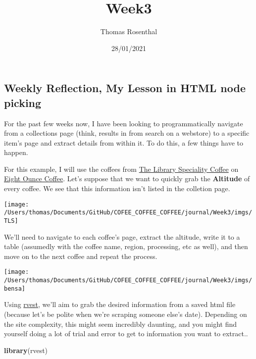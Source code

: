 \documentclass[]{article}
\title{Week3}
\author{Thomas Rosenthal}
\date{28/01/2021}
\newenvironment{Shaded}{\begin{snugshade}}{\end{snugshade}}
\newcommand{\KeywordTok}[1]{\textcolor[rgb]{0.13,0.29,0.53}{\textbf{#1}}}
\newcommand{\NormalTok}[1]{#1}
\begin{document}
\maketitle

\hypertarget{weekly-reflection-my-lesson-in-html-node-picking}{%
\subsection{Weekly Reflection, My Lesson in HTML node
picking}\label{weekly-reflection-my-lesson-in-html-node-picking}}

For the past few weeks now, I have been looking to programmatically
navigate from a collections page (think, results in from search on a
webstore) to a specific item's page and extract details from within it.
To do this, a few things have to happen.

For this example, I will use the coffees from
\href{https://www.thelibraryspecialtycoffee.com/}{The Library Speciality
Coffee} on
\href{https://eightouncecoffee.ca/collections/the-library-specialty-coffee}{Eight
Ounce Coffee}. Let's suppose that we want to quickly grab the
\textbf{Altitude} of every coffee. We see that this information isn't
listed in the colletion page.

\texttt{[image: /Users/thomas/Documents/GitHub/COFEE\_COFFEE\_COFFEE/journal/Week3/imgs/TLS]}

We'll need to navigate to each coffee's page, extract the altitude,
write it to a table (assumedly with the coffee name, region, processing,
etc as well), and then move on to the next coffee and repeat the
process.

\texttt{[image: /Users/thomas/Documents/GitHub/COFEE\_COFFEE\_COFFEE/journal/Week3/imgs/bensa]}

Using
\href{https://blog.rstudio.com/2014/11/24/rvest-easy-web-scraping-with-r/}{rvest},
we'll aim to grab the desired information from a saved html file
(because let's be polite when we're scraping someone else's date).
Depending on the site complexity, this might seem incredibly daunting,
and you might find yourself doing a lot of trial and error to get to
information you want to extract..

\begin{Shaded}
\begin{Highlighting}[]
\KeywordTok{library}\NormalTok{(rvest)}
\end{Highlighting}
\end{Shaded}
\end{document}
